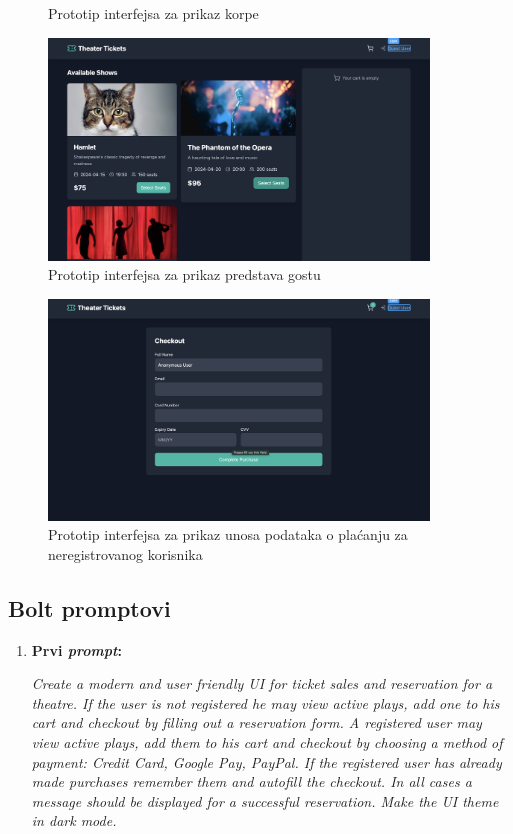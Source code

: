 \begin{itemize}
\begin{figure}[H]
    \caption{Prototip interfejsa za prikaz korpe}
    \label{fig:userfrontlist}
\end{figure}
\begin{figure}[H]
    \centering
    \includegraphics[width=0.9\textwidth]{Slike/FZ2ui/guesthome.png}
    \caption{Prototip interfejsa za prikaz predstava gostu}
    \label{fig:guesthome}
\end{figure}
\begin{figure}[H]
    \centering
    \includegraphics[width=0.9\textwidth]{Slike/FZ2ui/guestcheck.png}
    \caption{Prototip interfejsa za prikaz unosa podataka o plaćanju za neregistrovanog korisnika}
    \label{fig:questcheck}
\end{figure}
\subsection{Bolt promptovi}
\begin{enumerate}[itemsep=1ex]
    \item \textbf{Prvi \textit{prompt}:}

        \textit{ Create a modern and user friendly UI for ticket sales and reservation for a theatre. If the user is not registered he may view active plays, add one to his cart and checkout by filling out a reservation form. A registered user may view active plays, add them to his cart and checkout by choosing a method of payment: Credit Card, Google Pay, PayPal. If the registered user has already made purchases remember them and autofill the checkout. In all cases a message should be displayed for a successful reservation. Make the UI theme in dark mode.}


\end{enumerate}
\end{itemize}

